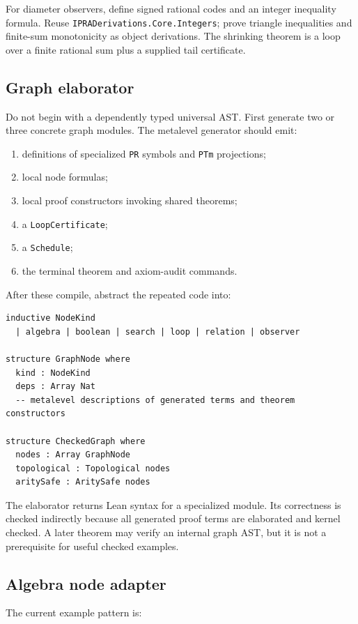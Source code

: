 For diameter observers, define signed rational codes and an integer inequality formula.  Reuse \texttt{IPRADerivations.Core.Integers}; prove triangle inequalities and finite-sum monotonicity as object derivations.  The shrinking theorem is a loop over a finite rational sum plus a supplied tail certificate.

\subsection{Graph elaborator}

Do not begin with a dependently typed universal AST.  First generate two or three concrete graph modules.  The metalevel generator should emit:
\begin{enumerate}[label=(\arabic*)]
  \item definitions of specialized \texttt{PR} symbols and \texttt{PTm} projections;
  \item local node formulas;
  \item local proof constructors invoking shared theorems;
  \item a \texttt{LoopCertificate};
  \item a \texttt{Schedule};
  \item the terminal theorem and axiom-audit commands.
\end{enumerate}
After these compile, abstract the repeated code into:

\begin{lstlisting}
inductive NodeKind
  | algebra | boolean | search | loop | relation | observer

structure GraphNode where
  kind : NodeKind
  deps : Array Nat
  -- metalevel descriptions of generated terms and theorem constructors

structure CheckedGraph where
  nodes : Array GraphNode
  topological : Topological nodes
  aritySafe : AritySafe nodes
\end{lstlisting}
The elaborator returns Lean syntax for a specialized module.  Its correctness is checked indirectly because all generated proof terms are elaborated and kernel checked.  A later theorem may verify an internal graph AST, but it is not a prerequisite for useful checked examples.

\subsection{Algebra node adapter}

The current example pattern is:

